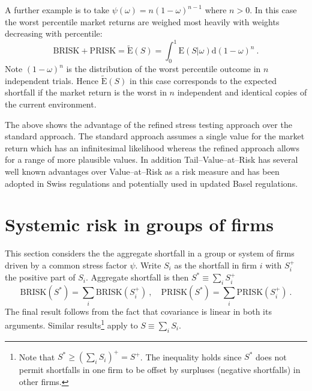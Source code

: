 \documentclass[authoryear]{elsarticle}
\newcommand{\E}{{\mathrm E}}
\newcommand{\de}{\mathrm{d}}
\newcommand{\cq}{\ ,\quad }
\newcommand{\br}{\ensuremath{\mathrm{BRISK}}}
\newcommand{\pr}{\ensuremath{\mathrm{PRISK}}}
\begin{document}
A further example is to take $\psi(\omega)=n(1-\omega)^{n-1}$ where $n>0$.   In this case the worst percentile market returns are weighed most heavily with weights decreasing with percentile:
$$
\br+\pr=\widetilde \E(S) =  \int_0^1 \E(S|\omega)\de(1-\omega)^n \ .
$$
Note $(1-\omega)^n$ is the  distribution of the  worst percentile outcome in $n$ independent trials.  Hence $\widetilde\E(S)$ in this case corresponds to the expected shortfall if the market return is the worst in $n$ independent and identical copies of the current environment.

The above   shows the advantage of the refined stress testing approach over the standard approach. The standard approach assumes a single value for the market return which has an infinitesimal likelihood whereas the refined approach allows for a range of more plausible values. In addition Tail--Value--at--Risk has several well known advantages over Value--at--Risk as a risk measure and has been adopted in Swiss regulations and potentially used in updated Basel regulations.



\section{Systemic risk in groups of firms}\label{s_formal}

This section considers the the aggregate shortfall in a group or system of firms driven by a common stress factor $\psi$.   Write $S_i$ as the shortfall in firm $i$ with $S_i^+$ the positive part of $S_i$.    Aggregate shortfall is then $S^*\equiv\sum_iS^+_i$
\begin{equation}\label{new}
\br(S^*) = \sum_i\br(S^+_i)\cq \pr(S^*) = \sum_i\pr(S^+_i)\ .
\end{equation}
The final result follows from the fact that covariance is linear in both its arguments.  Similar results\footnote{Note that $S^*\ge (\sum_iS_i)^+=S^+$.  The  inequality holds since $S^*$ does not permit shortfalls in one firm to be offset by surpluses (negative shortfalls) in other firms.}  apply to
$S\equiv \sum_i S_i$.
\end{document}
